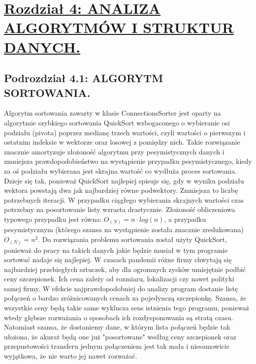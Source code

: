 \documentclass[a4paper]{article}
\newcommand\tab[1][1cm]{\hspace*{#1}}
\begin{document}
\section*{\underline{Rozdział 4: ANALIZA ALGORYTMÓW I STRUKTUR DANYCH.}}
\subsection*{Podrozdział 4.1: ALGORYTM SORTOWANIA.}
Algorytm sortowania zawarty w klasie ConnectionsSorter jest oparty na algorytmie szybkiego sortowania QuickSort wzbogaconego o wybieranie osi podziału (pivota) poprzez medianę trzech wartości, czyli wartości o pierwszym i ostatnim indeksie w wektorze oraz losowej z pomiędzy nich. Takie rozwiązanie znacznie amortyzuje złożoność algorytmu przy pesymistycznych danych i zmniejsza prawdopodobieństwo na wystąpienie przypadku pesymistycznego, kiedy za oś podziału wybierana jest skrajna wartość co wydłuża proces sortowania. Dzieje się tak, ponieważ QuickSort najlepiej spisuje się, gdy w wyniku podziału wektora powstają dwa jak najbardziej równe podwektory. Zmniejsza to liczbę potrzebnych iteracji. W przypadku ciągłego wybierania skrajnych wartości czas potrzebny na posortowanie listy wzrasta drastycznie. 
\newline \tab Złożoność obliczeniowa typowego przypadku jest równa: $O_{(N)} = n \cdot log(n)$, a przypadku pesymistycznym (którego szansa na wystąpienie została znacznie zredukowana) $O_{(N)} = n^2$. 
\newline \tab Do rozwiązania problemu sortowania został użyty QuickSort, ponieważ do pracy na takich danych jakie będzie musiał w tym programie sortować nadaje się najlepiej. W czasach pandemii różne firmy chwytają się najbardziej przebiegłych sztuczek, aby dla ogromnych zysków umiejętnie podbić ceny szczepionek. Ich cena zależy od rozmiaru, lokalizacji czy nawet polityki samej firmy. W efekcie najprawdopodobniej do analizy program dostanie listę połączeń o bardzo zróżnicowanych cenach za pojedynczą szczepionkę. Szansa, że wszystkie ceny będą takie same wyklucza sens istnienia tego programu, ponieważ wtedy głębsze rozważania o sposobach ich rozdysponowania są stratą czasu. Natomiast szansa, że dostaniemy dane, w którym lista połączeń będzie tak ułożona, że akurat będą one już "posortowane" według ceny szczepionek oraz przepustowości transferu jednym połączeniem jest tak mała i niesamowicie wyjątkowa, że nie warto jej nawet rozważać.
\end{document}

